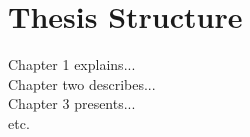 \section{Thesis Structure}
Chapter 1 explains... \\
Chapter two describes... \\
Chapter 3 presents... \\
etc.
	
